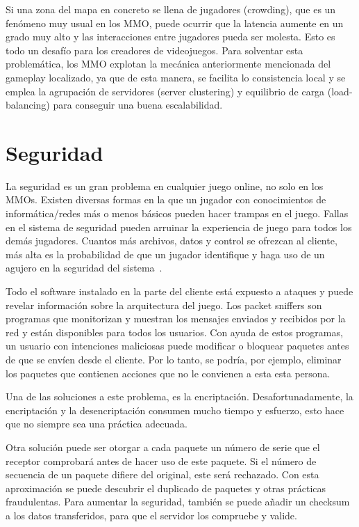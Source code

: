 \documentclass[runningheads]{llncs}
\begin{document}
Si una zona del mapa en concreto se llena de jugadores (crowding), que es un fenómeno muy usual en los MMO, puede ocurrir que la latencia aumente en un grado muy alto y las interacciones entre jugadores pueda ser molesta.
Esto es todo un desafío para los creadores de videojuegos.
Para solventar esta problemática, los MMO explotan la mecánica anteriormente mencionada del gameplay localizado, ya que de esta manera, se facilita lo consistencia local y se emplea la agrupación de servidores (server clustering) y equilibrio de carga (load-balancing) para conseguir una buena escalabilidad.

\section{Seguridad}

La seguridad es un gran problema en cualquier juego online, no solo en los MMOs.
Existen diversas formas en la que un jugador con conocimientos de informática/redes más o menos básicos pueden hacer trampas en el juego.
Fallas en el sistema de seguridad pueden arruinar la experiencia de juego para todos los demás jugadores.
Cuantos más archivos, datos y control se ofrezcan al cliente, más alta es la probabilidad de que un jugador identifique y haga uso de un agujero en la seguridad del sistema~\cite{datacomm}.

Todo el software instalado en la parte del cliente está expuesto a ataques y puede revelar información sobre la arquitectura del juego.
Los packet sniffers son programas que monitorizan y muestran los mensajes enviados y recibidos por la red y están disponibles para todos los usuarios.
Con ayuda de estos programas, un usuario con intenciones maliciosas puede modificar o bloquear paquetes antes de que se envíen desde el cliente.
Por lo tanto, se podría, por ejemplo, eliminar los paquetes que contienen acciones que no le convienen a esta esta persona.

Una de las soluciones a este problema, es la encriptación.
Desafortunadamente, la encriptación y la desencriptación consumen mucho tiempo y esfuerzo, esto hace que no siempre sea una práctica adecuada.

Otra solución puede ser otorgar a cada paquete un número de serie que el receptor comprobará antes de hacer uso de este paquete.
Si el número de secuencia de un paquete difiere del original, este será rechazado.
Con esta aproximación se puede descubrir el duplicado de paquetes y otras prácticas fraudulentas.
Para aumentar la seguridad, también se puede añadir un checksum a los datos transferidos, para que el servidor los compruebe y valide.
\end{document}
